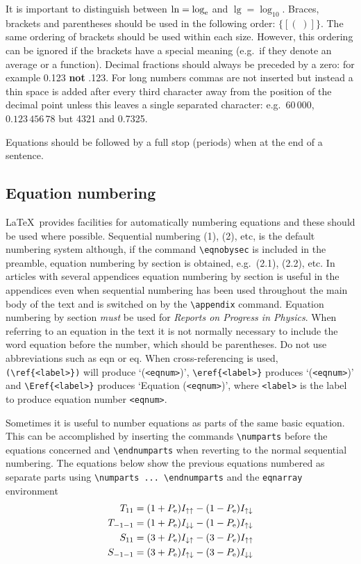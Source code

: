 \documentclass[12pt]{iopart}
\begin{document}
It is important to distinguish between $\ln = \log_{\mathrm{e}}$ and $\lg 
=\log_{10}$. Braces, brackets and parentheses should be used in the 
following order: $\{[(\;)]\}$. The same ordering of brackets should be 
used within each size. However, this ordering can be ignored if the
brackets have a 
special meaning (e.g.\ if they denote an average or a function).  Decimal 
fractions should 
always be preceded by a zero: for example 0.123 {\bf not} .123. For long 
numbers commas are not inserted but instead a thin space is added after 
every third character away from the position of the decimal point unless 
this leaves a single separated character: e.g.\ $60\,000$, $0.123\,456\,78$ 
but 4321 and 0.7325.

Equations should be followed by a full stop (periods) when at the end
of a sentence.

\subsection{Equation numbering}
\label{eqnum}
\LaTeX\ provides facilities for automatically numbering equations 
and these should be used where possible. Sequential numbering (1), (2), 
etc, is the default numbering system although, if the command
\verb"\eqnobysec" is included in the preamble, equation numbering
by section is obtained, e.g.\ 
(2.1), (2.2), etc. In articles with several appendices equation numbering
by section is useful in the appendices even when sequential numbering has
been used throughout the main body of the text and is switched on by the 
\verb"\appendix" command. Equation numbering by section {\it must} 
be used for {\it Reports on Progress in 
Physics}. When referring to an equation in the text it is not normally necessary to include the word equation before the number, 
which should be parentheses. Do not 
use abbreviations such as eqn or eq.
When cross-referencing is used, \verb"(\ref{<label>})"
 will produce `(\verb"<eqnum>")',
\verb"\eref{<label>}" produces `(\verb"<eqnum>")' and
\verb"\Eref{<label>}" produces `Equation (\verb"<eqnum>")', 
where \verb"<label>" is the label to produce equation number \verb"<eqnum>".

Sometimes it is useful to number equations as parts of the same
basic equation. This can be accomplished by inserting the 
commands \verb"\numparts" before the equations concerned and 
\verb"\endnumparts" when reverting to the normal sequential numbering.
The equations below show the previous equations numbered as separate parts
using \verb"\numparts ... \endnumparts" and the \verb"eqnarray"
environment
\numparts
\begin{eqnarray}
T_{11}&=(1+P_{\mathrm{e}})I_{\uparrow\uparrow}-(1-P_{\mathrm{e}})
I_{\uparrow\downarrow}\\
T_{-1-1}&=(1+P_{\mathrm{e}})I_{\downarrow\downarrow}-(1-P_{\mathrm{e}})I_{\uparrow\downarrow}\\
S_{11}&=(3+P_{\mathrm{e}})I_{\downarrow\uparrow}-(3-P_e)I_{\uparrow\uparrow}\\
S_{-1-1}&=(3+P_{\mathrm{e}})I_{\uparrow\downarrow}-(3-P_{\mathrm{e}})
I_{\downarrow\downarrow}
\end{eqnarray}
\endnumparts
\end{document}
